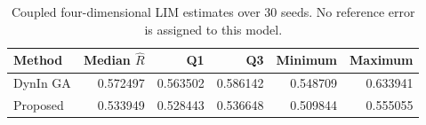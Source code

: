 \begin{table}[htbp]
\centering\small
\caption{Coupled four-dimensional LIM estimates over 30 seeds. No reference error is assigned to this model.}
\label{tab:comparison-coupled}
\begin{tabularx}{\linewidth}{@{}Y r r r r r@{}}
\toprule
Method & Median $\hat R$ & Q1 & Q3 & Minimum & Maximum \\
\midrule
DynIn GA & 0.572497 & 0.563502 & 0.586142 & 0.548709 & 0.633941 \\
Proposed & 0.533949 & 0.528443 & 0.536648 & 0.509844 & 0.555055 \\
\bottomrule
\end{tabularx}
\end{table}
